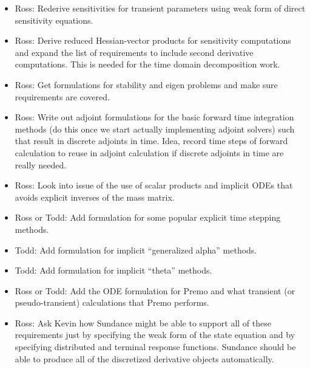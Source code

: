\documentclass[pdf,ps2pdf,11pt]{SANDreport}
\begin{document}
\begin{itemize}
%
{}\item Ross: Rederive sensitivities for transient parameters using weak form
of direct sensitivity equations.
%
{}\item Ross: Derive reduced Hessian-vector products for sensitivity
computations and expand the list of requirements to include second derivative
computations.  This is needed for the time domain decomposition work.
%
{}\item Ross: Get formulations for stability and eigen problems and make sure
requirements are covered.
%
{}\item Ross: Write out adjoint formulations for the basic forward time
integration methods (do this once we start actually implementing adjoint
solvers) such that result in discrete adjoints in time.  Idea, record time
steps of forward calculation to reuse in adjoint calculation if discrete
adjoints in time are really needed.
%
{}\item Ross: Look into issue of the use of scalar products and implicit ODEs that
avoids explicit inverses of the mass matrix.
%
{}\item Ross or Todd: Add formulation for some popular explicit time stepping
methods.
%
{}\item Todd: Add formulation for implicit ``generalized alpha'' methods.
%
{}\item Todd: Add formulation for implicit ``theta'' methods.
%
{}\item Ross or Todd: Add the ODE formulation for Premo and what transient (or
pseudo-transient) calculations that Premo performs.
%
{}\item Ross: Ask Kevin how Sundance might be able to support all of these
requirements just by specifying the weak form of the state equation and by
specifying distributed and terminal response functions.  Sundance should be
able to produce all of the discretized derivative objects automatically.
%
\end{itemize}

\begin{SANDdistribution}
\end{SANDdistribution}
\end{document}
